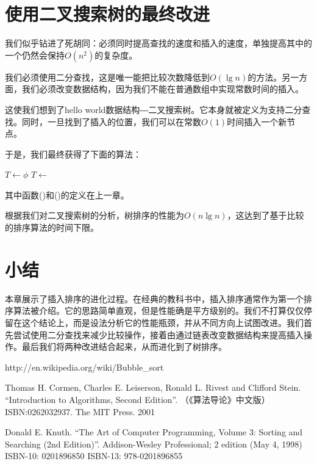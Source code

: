 \documentclass[UTF8]{article}
\begin{document}

\section{使用二叉搜索树的最终改进}

我们似乎钻进了死胡同：必须同时提高查找的速度和插入的速度，单独提高其中的一个仍然会保持$O(n^2)$的复杂度。

我们必须使用二分查找，这是唯一能把比较次数降低到$O(\lg n)$的方法。另一方面，我们必须改变数据结构，因为我们不能在普通数组中实现常数时间的插入。

这使我们想到了hello world数据结构―二叉搜索树。它本身就被定义为支持二分查找。同时，一旦找到了插入的位置，我们可以在常数$O(1)$时间插入一个新节点。

于是，我们最终获得了下面的算法：

\begin{algorithmic}
  \State $T \gets \phi$
    \State $T \gets $ 
  \EndFor
  \State \Return {}
\EndFunction
\end{algorithmic}

其中函数()和()的定义在上一章。

根据我们对二叉搜索树的分析，树排序的性能为$O(n \lg n)$，这达到了基于比较的排序算法的时间下限\cite{Knuth}。

\section{小结}
本章展示了插入排序的进化过程。在经典的教科书中，插入排序通常作为第一个排序算法被介绍。它的思路简单直观，但是性能确是平方级别的。我们不打算仅仅停留在这个结论上，而是设法分析它的性能瓶颈，并从不同方向上试图改进。我们首先尝试使用二分查找来减少比较操作，接着由通过链表改变数据结构来提高插入操作。最后我们将两种改进结合起来，从而进化到了树排序。

\begin{thebibliography}{99}

http://en.wikipedia.org/wiki/Bubble\_sort

Thomas H. Cormen, Charles E. Leiserson, Ronald L. Rivest and Clifford Stein.
``Introduction to Algorithms, Second Edition''. （《算法导论》中文版）ISBN:0262032937. The MIT Press. 2001

Donald E. Knuth. ``The Art of Computer Programming, Volume 3: Sorting and Searching (2nd Edition)''. Addison-Wesley Professional; 2 edition (May 4, 1998) ISBN-10: 0201896850 ISBN-13: 978-0201896855

\end{thebibliography}

\ifx\wholebook\relax\else
\end{document}
